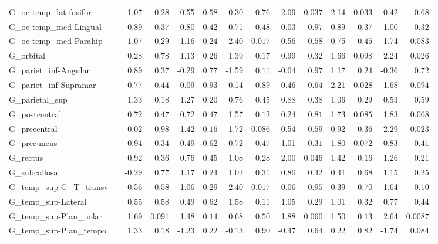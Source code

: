 {\begin{longtable}{llrrrrrrrrrrrr}
G\_oc-temp\_lat-fusifor &  & 1.07 & $0.28$ & 0.55 & $0.58$ & 0.30 & $0.76$ & 2.09 & $0.037$ & 2.14 & $0.033$ & 0.42 & $0.68$ \\
G\_oc-temp\_med-Lingual &  & 0.89 & $0.37$ & 0.80 & $0.42$ & 0.71 & $0.48$ & 0.03 & $0.97$ & 0.89 & $0.37$ & 1.00 & $0.32$ \\
G\_oc-temp\_med-Parahip &  & 1.07 & $0.29$ & 1.16 & $0.24$ & 2.40 & $0.017$ & -0.56 & $0.58$ & 0.75 & $0.45$ & 1.74 & $0.083$ \\
G\_orbital &  & 0.28 & $0.78$ & 1.13 & $0.26$ & 1.39 & $0.17$ & 0.99 & $0.32$ & 1.66 & $0.098$ & 2.24 & $0.026$ \\
G\_pariet\_inf-Angular &  & 0.89 & $0.37$ & -0.29 & $0.77$ & -1.59 & $0.11$ & -0.04 & $0.97$ & 1.17 & $0.24$ & -0.36 & $0.72$ \\
G\_pariet\_inf-Supramar &  & 0.77 & $0.44$ & 0.09 & $0.93$ & -0.14 & $0.89$ & 0.46 & $0.64$ & 2.21 & $0.028$ & 1.68 & $0.094$ \\
G\_parietal\_sup &  & 1.33 & $0.18$ & 1.27 & $0.20$ & 0.76 & $0.45$ & 0.88 & $0.38$ & 1.06 & $0.29$ & 0.53 & $0.59$ \\
G\_postcentral &  & 0.72 & $0.47$ & 0.72 & $0.47$ & 1.57 & $0.12$ & 0.24 & $0.81$ & 1.73 & $0.085$ & 1.83 & $0.068$ \\
G\_precentral &  & 0.02 & $0.98$ & 1.42 & $0.16$ & 1.72 & $0.086$ & 0.54 & $0.59$ & 0.92 & $0.36$ & 2.29 & $0.023$ \\
G\_precuneus &  & 0.94 & $0.34$ & 0.49 & $0.62$ & 0.72 & $0.47$ & 1.01 & $0.31$ & 1.80 & $0.072$ & 0.83 & $0.41$ \\
G\_rectus &  & 0.92 & $0.36$ & 0.76 & $0.45$ & 1.08 & $0.28$ & 2.00 & $0.046$ & 1.42 & $0.16$ & 1.26 & $0.21$ \\
G\_subcallosal &  & -0.29 & $0.77$ & 1.17 & $0.24$ & 1.02 & $0.31$ & 0.80 & $0.42$ & 0.41 & $0.68$ & 1.15 & $0.25$ \\
G\_temp\_sup-G\_T\_transv &  & 0.56 & $0.58$ & -1.06 & $0.29$ & -2.40 & $0.017$ & 0.06 & $0.95$ & 0.39 & $0.70$ & -1.64 & $0.10$ \\
G\_temp\_sup-Lateral &  & 0.55 & $0.58$ & 0.49 & $0.62$ & 1.58 & $0.11$ & 1.05 & $0.29$ & 1.01 & $0.32$ & 0.77 & $0.44$ \\
G\_temp\_sup-Plan\_polar &  & 1.69 & $0.091$ & 1.48 & $0.14$ & 0.68 & $0.50$ & 1.88 & $0.060$ & 1.50 & $0.13$ & 2.64 & $0.0087$ \\
G\_temp\_sup-Plan\_tempo &  & 1.33 & $0.18$ & -1.23 & $0.22$ & -0.13 & $0.90$ & -0.47 & $0.64$ & 0.22 & $0.82$ & -1.74 & $0.084$ \\

\end{longtable}}
